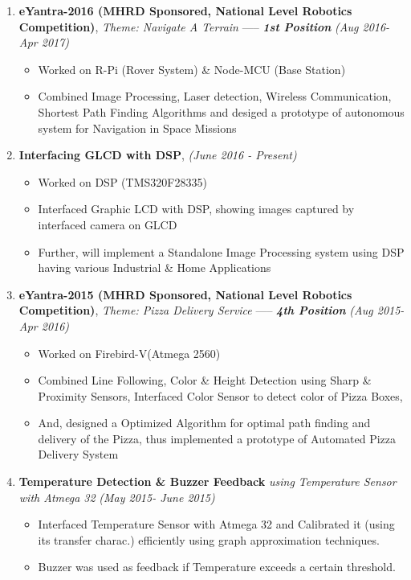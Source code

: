 \documentclass[10pt,a4paper,sans]{moderncv} %
\begin{document}
\begin{enumerate}

\item \textbf{eYantra-2016 (MHRD Sponsored, National Level Robotics Competition)}, \newline\textit{Theme: Navigate A Terrain}  ----- \textbf{\textit{1st Position}}       \textit{ (Aug 2016- Apr 2017) }
\begin{itemize}
\item Worked on R-Pi (Rover System) \& Node-MCU (Base Station)
\item Combined Image Processing, Laser detection, Wireless Communication, Shortest Path Finding Algorithms and desiged a prototype of autonomous system for Navigation in Space Missions
\newline
\end{itemize}

\item \textbf{Interfacing GLCD with DSP},     \textit{ (June 2016 - Present) }
\begin{itemize}
\item Worked on DSP (TMS320F28335)
\item Interfaced Graphic LCD with DSP, showing images captured by interfaced camera on GLCD
\item Further, will implement a Standalone Image Processing system using DSP having various Industrial \& Home Applications
\newline
\end{itemize}

\item \textbf{eYantra-2015  (MHRD Sponsored, National Level Robotics Competition)}, \newline\textit{Theme: Pizza Delivery Service} ----- \textbf{\textit{4th Position}}                  \textit{ (Aug 2015- Apr 2016) }
\begin{itemize}
\item Worked on Firebird-V(Atmega 2560)
\item Combined Line Following, Color \& Height Detection using Sharp \& Proximity Sensors, Interfaced Color Sensor to detect color of Pizza Boxes, 
\item And, designed a Optimized Algorithm for optimal path finding and delivery of the Pizza, thus implemented a prototype of Automated Pizza Delivery System
\newline
\end{itemize}

\item \textbf{Temperature Detection \& Buzzer Feedback} \textit{ using Temperature Sensor  with Atmega 32}  \textit{ (May 2015- June 2015) }
\begin{itemize}
\item Interfaced Temperature Sensor with Atmega 32 and Calibrated it (using its transfer charac.) efficiently using graph approximation techniques.
\item Buzzer was used as feedback if Temperature exceeds a certain threshold.
\end{itemize}

\end{enumerate}
\end{document}
